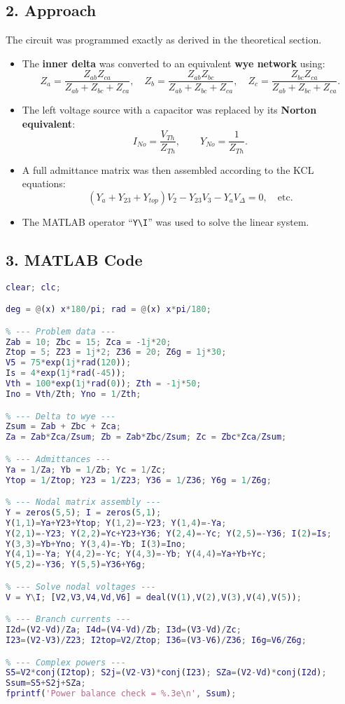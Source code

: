 \documentclass{article}
\begin{document}
\subsection*{2. Approach}
The circuit was programmed exactly as derived in the theoretical section.  
\begin{itemize}
    \item The \textbf{inner delta} was converted to an equivalent \textbf{wye network} using:
    \[
    Z_a = \frac{Z_{ab}Z_{ca}}{Z_{ab}+Z_{bc}+Z_{ca}},\quad
    Z_b = \frac{Z_{ab}Z_{bc}}{Z_{ab}+Z_{bc}+Z_{ca}},\quad
    Z_c = \frac{Z_{bc}Z_{ca}}{Z_{ab}+Z_{bc}+Z_{ca}}.
    \]
    \item The left voltage source with a capacitor was replaced by its \textbf{Norton equivalent}:
    \[
    I_{No} = \frac{V_{Th}}{Z_{Th}}, \qquad Y_{No} = \frac{1}{Z_{Th}}.
    \]
    \item A full admittance matrix was then assembled according to the KCL equations:
    \[
    (Y_a+Y_{23}+Y_{top})V_2 - Y_{23}V_3 - Y_aV_\Delta = 0, \quad \text{etc.}
    \]
    \item The MATLAB operator ``\texttt{Y\textbackslash I}'' was used to solve the linear system.
\end{itemize}

\subsection*{3. MATLAB Code}

\begin{lstlisting}[language=Matlab, caption={MATLAB script used for solving Exercise 3.}, label={lst:matlab_ex3}]
%% Exercise 3 - Network Analysis with Phasors
clear; clc;

deg = @(x) x*180/pi; rad = @(x) x*pi/180;

% --- Problem data ---
Zab = 10; Zbc = 15; Zca = -1j*20;
Ztop = 5; Z23 = 1j*2; Z36 = 20; Z6g = 1j*30;
V5 = 75*exp(1j*rad(120));
Is = 4*exp(1j*rad(-45));
Vth = 100*exp(1j*rad(0)); Zth = -1j*50;
Ino = Vth/Zth; Yno = 1/Zth;

% --- Delta to wye ---
Zsum = Zab + Zbc + Zca;
Za = Zab*Zca/Zsum; Zb = Zab*Zbc/Zsum; Zc = Zbc*Zca/Zsum;

% --- Admittances ---
Ya = 1/Za; Yb = 1/Zb; Yc = 1/Zc;
Ytop = 1/Ztop; Y23 = 1/Z23; Y36 = 1/Z36; Y6g = 1/Z6g;

% --- Nodal matrix assembly ---
Y = zeros(5,5); I = zeros(5,1);
Y(1,1)=Ya+Y23+Ytop; Y(1,2)=-Y23; Y(1,4)=-Ya;
Y(2,1)=-Y23; Y(2,2)=Yc+Y23+Y36; Y(2,4)=-Yc; Y(2,5)=-Y36; I(2)=Is;
Y(3,3)=Yb+Yno; Y(3,4)=-Yb; I(3)=Ino;
Y(4,1)=-Ya; Y(4,2)=-Yc; Y(4,3)=-Yb; Y(4,4)=Ya+Yb+Yc;
Y(5,2)=-Y36; Y(5,5)=Y36+Y6g;

% --- Solve nodal voltages ---
V = Y\I; [V2,V3,V4,Vd,V6] = deal(V(1),V(2),V(3),V(4),V(5));

% --- Branch currents ---
I2d=(V2-Vd)/Za; I4d=(V4-Vd)/Zb; I3d=(V3-Vd)/Zc;
I23=(V2-V3)/Z23; I2top=V2/Ztop; I36=(V3-V6)/Z36; I6g=V6/Z6g;

% --- Complex powers ---
S5=V2*conj(I2top); S2j=(V2-V3)*conj(I23); SZa=(V2-Vd)*conj(I2d);
Ssum=S5+S2j+SZa;
fprintf('Power balance check = %.3e\n', Ssum);
\end{lstlisting}
\end{document}
